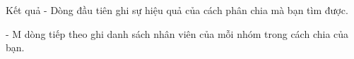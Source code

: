 Kết quả
- Dòng đầu tiên ghi sự hiệu quả của cách phân chia mà bạn tìm được.   


   - M dòng tiếp theo ghi danh sách nhân viên của mỗi nhóm trong cách chia của bạn.